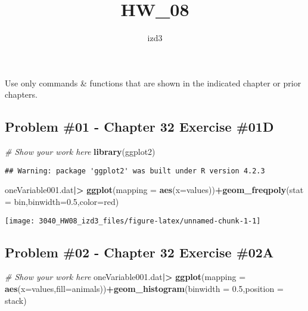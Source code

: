 \documentclass[
]{article}
\title{HW\_08}
\author{izd3}
\date{}
\newenvironment{Shaded}{\begin{snugshade}}{\end{snugshade}}
\newcommand{\AttributeTok}[1]{\textcolor[rgb]{0.13,0.29,0.53}{#1}}
\newcommand{\CommentTok}[1]{\textcolor[rgb]{0.56,0.35,0.01}{\textit{#1}}}
\newcommand{\FloatTok}[1]{\textcolor[rgb]{0.00,0.00,0.81}{#1}}
\newcommand{\FunctionTok}[1]{\textcolor[rgb]{0.13,0.29,0.53}{\textbf{#1}}}
\newcommand{\NormalTok}[1]{#1}
\newcommand{\SpecialCharTok}[1]{\textcolor[rgb]{0.81,0.36,0.00}{\textbf{#1}}}
\newcommand{\StringTok}[1]{\textcolor[rgb]{0.31,0.60,0.02}{#1}}
\begin{document}
\maketitle

Use only commands \& functions that are shown in the indicated chapter
or prior chapters.

\newpage

\hypertarget{problem-01---chapter-32-exercise-01d}{%
\subsection{Problem \#01 - Chapter 32 Exercise
\#01D}\label{problem-01---chapter-32-exercise-01d}}

\begin{Shaded}
\begin{Highlighting}[]
\CommentTok{\# Show your work here}
\FunctionTok{library}\NormalTok{(ggplot2)}
\end{Highlighting}
\end{Shaded}

\begin{verbatim}
## Warning: package 'ggplot2' was built under R version 4.2.3
\end{verbatim}

\begin{Shaded}
\begin{Highlighting}[]
\NormalTok{oneVariable001.dat}\SpecialCharTok{|\textgreater{}}
  \FunctionTok{ggplot}\NormalTok{(}\AttributeTok{mapping =} \FunctionTok{aes}\NormalTok{(}\AttributeTok{x=}\NormalTok{values))}\SpecialCharTok{+}\FunctionTok{geom\_freqpoly}\NormalTok{(}\AttributeTok{stat =} \StringTok{\textquotesingle{}bin\textquotesingle{}}\NormalTok{,}\AttributeTok{binwidth=}\FloatTok{0.5}\NormalTok{,}\AttributeTok{color=}\StringTok{\textquotesingle{}red\textquotesingle{}}\NormalTok{)}
\end{Highlighting}
\end{Shaded}

\texttt{[image: 3040\_HW08\_izd3\_files/figure-latex/unnamed-chunk-1-1]}

\newpage

\hypertarget{problem-02---chapter-32-exercise-02a}{%
\subsection{Problem \#02 - Chapter 32 Exercise
\#02A}\label{problem-02---chapter-32-exercise-02a}}

\begin{Shaded}
\begin{Highlighting}[]
\CommentTok{\# Show your work here}
\NormalTok{oneVariable001.dat}\SpecialCharTok{|\textgreater{}}
  \FunctionTok{ggplot}\NormalTok{(}\AttributeTok{mapping =} \FunctionTok{aes}\NormalTok{(}\AttributeTok{x=}\NormalTok{values,}\AttributeTok{fill=}\NormalTok{animals))}\SpecialCharTok{+}\FunctionTok{geom\_histogram}\NormalTok{(}\AttributeTok{binwidth =} \FloatTok{0.5}\NormalTok{,}\AttributeTok{position =} \StringTok{\textquotesingle{}stack\textquotesingle{}}\NormalTok{)}
\end{Highlighting}
\end{Shaded}
\end{document}
